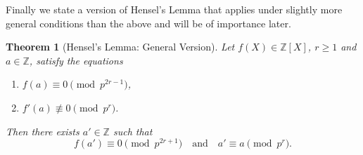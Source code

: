 \documentclass[11pt]{book}
\theoremstyle{plain}
\newtheorem{theorem}{Theorem}[chapter]
\theoremstyle{definition}
\begin{document}
Finally we state a version of Hensel's Lemma that applies under slightly more general conditions than the above and will be of importance later.

\begin{theorem}[Hensel's Lemma: General Version]
Let $f(X) \in \mathbb{Z}[X]$, $r \geq 1$ and $a \in \mathbb{Z}$, satisfy the equations
\begin{enumerate}
    \item[(a)] $f(a) \equiv 0 \pmod{p^{2r-1}}$,
    \item[(b)] $f'(a) \not\equiv 0 \pmod{p^r}$.
\end{enumerate}

Then there exists $a' \in \mathbb{Z}$ such that
\[
f(a') \equiv 0 \pmod{p^{2r+1}} \quad \text{and} \quad a' \equiv a \pmod{p^r}.
\]
\end{theorem}
\end{document}
